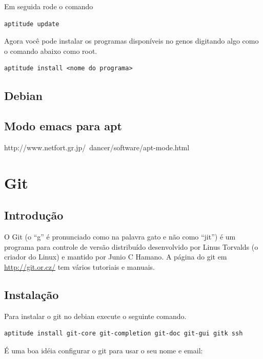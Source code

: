 \documentclass[12pt,brazil]{book}
\begin{document}
Em seguida rode o comando

\begin{verbatim}
aptitude update
\end{verbatim}

Agora você pode instalar os programas disponíveis no genos digitando
algo como o comando abaixo como root.

\begin{verbatim}
aptitude install <nome do programa>
\end{verbatim}

\section{Debian}
\label{sec:debian}

\section{Modo emacs para apt}
\label{sec:modo-emacs-para}

http://www.netfort.gr.jp/~dancer/software/apt-mode.html

\chapter{Git}
\label{cha:git}

\section{Introdução}
\label{sec:introducao}

O Git (o ``g'' é pronunciado como na palavra gato e não como ``jit'')
é um programa para controle de versão distribuído desenvolvido por
Linus Torvalds (o criador do Linux) e mantido por Junio C Hamano. A
página do git em \url{http://git.or.cz/} tem vários tutoriais e
manuais.

\section{Instalação}
\label{sec:instalacao-3}

Para instalar o git no debian execute o seguinte comando.

\begin{verbatim}
aptitude install git-core git-completion git-doc git-gui gitk ssh
\end{verbatim}

É uma boa idéia configurar o git para usar o seu nome e email:
\end{document}
